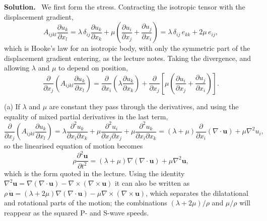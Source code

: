 \documentclass[a4paper,12pt]{paper}
\newenvironment{solution}{\par\noindent\textbf{Solution.}\ }{\par\medskip}
\begin{document}
\begin{solution}
We first form the stress. Contracting the isotropic tensor with the displacement gradient,
\begin{equation}
A_{ijkl}\frac{\partial u_{k}}{\partial x_{l}}
=\lambda\,\delta_{ij}\frac{\partial u_{k}}{\partial x_{k}}+\mu\left(\frac{\partial u_{i}}{\partial x_{j}}+\frac{\partial u_{j}}{\partial x_{i}}\right)
=\lambda\,\delta_{ij}\,e_{kk}+2\mu\,e_{ij},
\label{eq:31}
\end{equation}
which is Hooke's law for an isotropic body, with only the symmetric part of the displacement
gradient entering, as the lecture notes. Taking the divergence, and allowing $\lambda$ and $\mu$
to depend on position,
\begin{equation}
\frac{\partial}{\partial x_{j}}\left(A_{ijkl}\frac{\partial u_{k}}{\partial x_{l}}\right)
=\frac{\partial}{\partial x_{i}}\left(\lambda\frac{\partial u_{k}}{\partial x_{k}}\right)
+\frac{\partial}{\partial x_{j}}\left[\mu\left(\frac{\partial u_{i}}{\partial x_{j}}+\frac{\partial u_{j}}{\partial x_{i}}\right)\right].
\label{eq:32}
\end{equation}

(a) If $\lambda$ and $\mu$ are constant they pass through the derivatives, and using the equality
of mixed partial derivatives in the last term,
\begin{equation}
\frac{\partial}{\partial x_{j}}\left(A_{ijkl}\frac{\partial u_{k}}{\partial x_{l}}\right)
=\lambda\frac{\partial^{2}u_{k}}{\partial x_{i}\partial x_{k}}+\mu\frac{\partial^{2}u_{i}}{\partial x_{j}\partial x_{j}}
+\mu\frac{\partial^{2}u_{k}}{\partial x_{i}\partial x_{k}}
=(\lambda+\mu)\frac{\partial}{\partial x_{i}}(\nabla\cdot\mathbf{u})+\mu\nabla^{2}u_{i},
\label{eq:33}
\end{equation}
so the linearised equation of motion becomes
\begin{equation}
\rho\frac{\partial^{2}\mathbf{u}}{\partial t^{2}}=(\lambda+\mu)\nabla(\nabla\cdot\mathbf{u})+\mu\nabla^{2}\mathbf{u},
\label{eq:34}
\end{equation}
which is the form quoted in the lecture. Using the identity
$\nabla^{2}\mathbf{u}=\nabla(\nabla\cdot\mathbf{u})-\nabla\times(\nabla\times\mathbf{u})$ it can also be
written as $\rho\,\ddot{\mathbf{u}}=(\lambda+2\mu)\nabla(\nabla\cdot\mathbf{u})-\mu\nabla\times(\nabla\times\mathbf{u})$,
which separates the dilatational and rotational parts of the motion; the combinations
$(\lambda+2\mu)/\rho$ and $\mu/\rho$ will reappear as the squared P- and S-wave speeds.


\end{solution}
\end{document}
